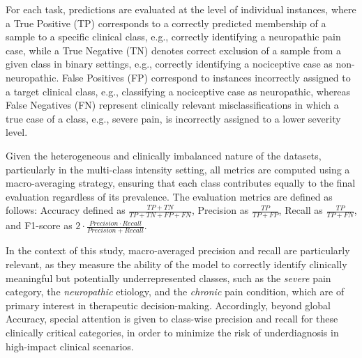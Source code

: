 \documentclass[preprint,12pt,authoryear]{elsarticle}
\begin{document}
For each task, predictions are evaluated at the level of individual instances, where a True Positive (TP) corresponds to a correctly predicted membership of a sample to a specific clinical class, e.g., correctly identifying a neuropathic pain case, while a True Negative (TN) denotes correct exclusion of a sample from a given class in binary settings, e.g., correctly identifying a nociceptive case as non-neuropathic. False Positives (FP) correspond to instances incorrectly assigned to a target clinical class, e.g., classifying a nociceptive case as neuropathic, whereas False Negatives (FN) represent clinically relevant misclassifications in which a true case of a class, e.g., severe pain, is incorrectly assigned to a lower severity level.

Given the heterogeneous and clinically imbalanced nature of the datasets, particularly in the multi-class intensity setting, all metrics are computed using a macro-averaging strategy, ensuring that each class contributes equally to the final evaluation regardless of its prevalence.
\noindent
The evaluation metrics are defined as follows: Accuracy defined as $\frac{TP + TN}{TP + TN + FP + FN}$, Precision as $\frac{TP}{TP + FP}$, Recall as $\frac{TP}{TP + FN}$, and F1-score as $2 \cdot \frac{Precision \cdot Recall}{Precision + Recall}$.

In the context of this study, macro-averaged precision and recall are particularly relevant, as they measure the ability of the model to correctly identify clinically meaningful but potentially underrepresented classes, such as the \textit{severe} pain category, the \textit{neuropathic} etiology, and the \textit{chronic} pain condition, which are of primary interest in therapeutic decision-making. Accordingly, beyond global Accuracy, special attention is given to class-wise precision and recall for these clinically critical categories, in order to minimize the risk of underdiagnosis in high-impact clinical scenarios.

\end{document}

